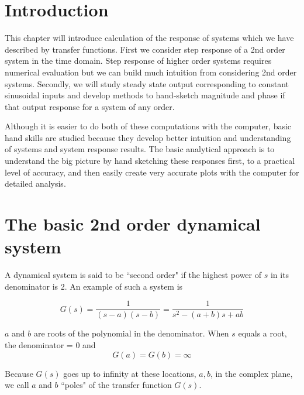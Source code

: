 \section{Introduction}
This chapter will introduce calculation of the response of systems which we have described 
by transfer functions.   First we consider step response of a 2nd order system in the time
domain.   Step response of higher order systems requires numerical evaluation but we can 
build much intuition from considering 2nd order systems.   Secondly,  we will study steady 
state output corresponding to constant sinusoidal inputs and develop methods to 
hand-sketch magnitude and phase if that output response for a system of any order. 

Although it is easier to do both of these computations with the computer, basic hand skills
are studied because they develop better intuition and understanding of systems and system response
results.  The basic analytical approach is to understand the big picture by hand sketching
these responses first, to a practical level of accuracy, and then easily
create very accurate plots with the computer for detailed analysis.

\section{The basic 2nd order dynamical system}

A dynamical system is said to be ``second order" if the highest power of $s$ in its denominator  is 2.  An example of such a system is

\[
G(s) = \frac1{(s-a)(s-b)} = \frac {1}{s^2 -(a+b)s+ab}
\]


$a$ and $b$ are roots of the polynomial in the denominator.  When $s$ equals a root, the denominator = 0 and
\[
G(a) = G(b) = \infty
\]

Because $G(s)$ goes up to infinity at these locations, $a,b$,  in the complex plane, we call $a$ and $b$ ``poles" of the transfer function
$G(s)$.

\newpage

